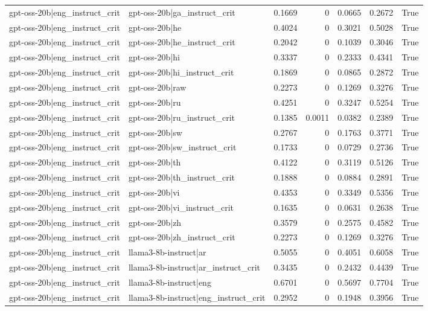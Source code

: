 \begin{table}
\begin{tabular}{l l r r r r l}
gpt-oss-20b|eng_instruct_crit & gpt-oss-20b|ga_instruct_crit & 0.1669 & 0 & 0.0665 & 0.2672 & True \\
gpt-oss-20b|eng_instruct_crit & gpt-oss-20b|he & 0.4024 & 0 & 0.3021 & 0.5028 & True \\
gpt-oss-20b|eng_instruct_crit & gpt-oss-20b|he_instruct_crit & 0.2042 & 0 & 0.1039 & 0.3046 & True \\
gpt-oss-20b|eng_instruct_crit & gpt-oss-20b|hi & 0.3337 & 0 & 0.2333 & 0.4341 & True \\
gpt-oss-20b|eng_instruct_crit & gpt-oss-20b|hi_instruct_crit & 0.1869 & 0 & 0.0865 & 0.2872 & True \\
gpt-oss-20b|eng_instruct_crit & gpt-oss-20b|raw & 0.2273 & 0 & 0.1269 & 0.3276 & True \\
gpt-oss-20b|eng_instruct_crit & gpt-oss-20b|ru & 0.4251 & 0 & 0.3247 & 0.5254 & True \\
gpt-oss-20b|eng_instruct_crit & gpt-oss-20b|ru_instruct_crit & 0.1385 & 0.0011 & 0.0382 & 0.2389 & True \\
gpt-oss-20b|eng_instruct_crit & gpt-oss-20b|sw & 0.2767 & 0 & 0.1763 & 0.3771 & True \\
gpt-oss-20b|eng_instruct_crit & gpt-oss-20b|sw_instruct_crit & 0.1733 & 0 & 0.0729 & 0.2736 & True \\
gpt-oss-20b|eng_instruct_crit & gpt-oss-20b|th & 0.4122 & 0 & 0.3119 & 0.5126 & True \\
gpt-oss-20b|eng_instruct_crit & gpt-oss-20b|th_instruct_crit & 0.1888 & 0 & 0.0884 & 0.2891 & True \\
gpt-oss-20b|eng_instruct_crit & gpt-oss-20b|vi & 0.4353 & 0 & 0.3349 & 0.5356 & True \\
gpt-oss-20b|eng_instruct_crit & gpt-oss-20b|vi_instruct_crit & 0.1635 & 0 & 0.0631 & 0.2638 & True \\
gpt-oss-20b|eng_instruct_crit & gpt-oss-20b|zh & 0.3579 & 0 & 0.2575 & 0.4582 & True \\
gpt-oss-20b|eng_instruct_crit & gpt-oss-20b|zh_instruct_crit & 0.2273 & 0 & 0.1269 & 0.3276 & True \\
gpt-oss-20b|eng_instruct_crit & llama3-8b-instruct|ar & 0.5055 & 0 & 0.4051 & 0.6058 & True \\
gpt-oss-20b|eng_instruct_crit & llama3-8b-instruct|ar_instruct_crit & 0.3435 & 0 & 0.2432 & 0.4439 & True \\
gpt-oss-20b|eng_instruct_crit & llama3-8b-instruct|eng & 0.6701 & 0 & 0.5697 & 0.7704 & True \\
gpt-oss-20b|eng_instruct_crit & llama3-8b-instruct|eng_instruct_crit & 0.2952 & 0 & 0.1948 & 0.3956 & True \\

\end{tabular}
\end{table}
